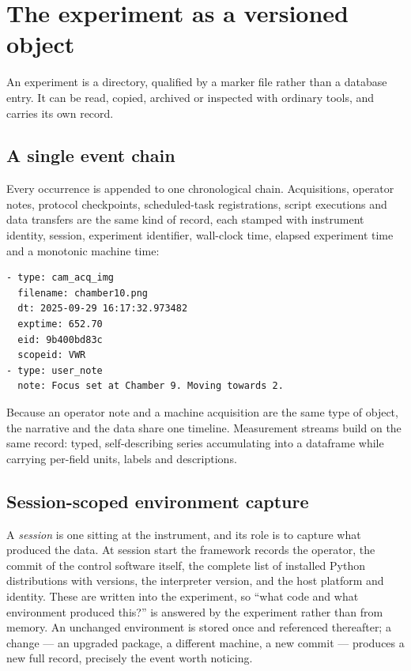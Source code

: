 \documentclass[10pt,a4paper,twocolumn]{article}
\begin{document}
\section{The experiment as a versioned object}

An experiment is a directory, qualified by a marker file rather than a database entry.
It can be read, copied, archived or inspected with ordinary tools, and carries its own
record.

\subsection{A single event chain}
Every occurrence is appended to one chronological chain. Acquisitions, operator
notes, protocol checkpoints, scheduled-task registrations, script executions and
data transfers are the same kind of record, each stamped with instrument identity,
session, experiment identifier, wall-clock time, elapsed experiment time and a
monotonic machine time:

\begin{lstlisting}[language=bash]
- type: cam_acq_img
  filename: chamber10.png
  dt: 2025-09-29 16:17:32.973482
  exptime: 652.70
  eid: 9b400bd83c
  scopeid: VWR
- type: user_note
  note: Focus set at Chamber 9. Moving towards 2.
\end{lstlisting}

Because an operator note and a machine acquisition are the same type of object, the
narrative and the data share one timeline. Measurement streams build on the same record:
typed, self-describing series accumulating into a dataframe while carrying per-field
units, labels and descriptions.

\subsection{Session-scoped environment capture}
A \emph{session} is one sitting at the instrument, and its role is to capture what
produced the data. At session start the framework records the operator, the commit
of the control software itself, the complete list of installed Python distributions
with versions, the interpreter version, and the host platform and identity. These are written into the experiment, so ``what code and what environment produced
this?'' is answered by the experiment rather than from memory. An unchanged environment
is stored once and referenced thereafter; a change --- an upgraded package, a different
machine, a new commit --- produces a new full record, precisely the event worth
noticing.
\end{document}
